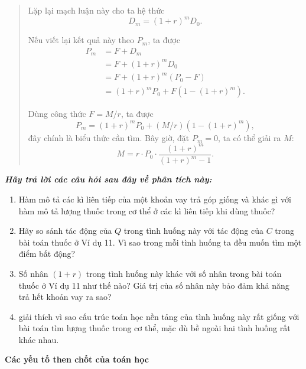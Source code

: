 {\begin{quote}
      Lặp lại mạch luận này cho ta hệ thức
      $$
        D_m = (1 + r)^m D_0.
      $$

      Nếu viết lại kết quả này theo $P_m$, ta được
      \begin{align*}
      P_m
        &=F+D_m \\
        &=F+(1+r)^mD_0 \\
        &=F+(1+r)^m(P_0-F) \\
        &=(1+r)^mP_0+F\left(1-(1+r)^m\right).
      \end{align*}

      Dùng công thức $F=M/r$, ta được\vspace{\baselineskip}
      $$
        P_m=(1+r)^mP_0+(M/r)\left(1-(1+r)^m\right),
      $$
      đây chính là biểu thức cần tìm. Bây giờ, đặt $P_m=0$, ta có thể giải ra $M$:
      $$
        M=r\cdot P_0\cdot \frac{(1+r)^m}{(1+r)^m-1}.
      $$
    \end{quote}

    \textbf{\emph{Hãy trả lời các câu hỏi sau đây về phân tích này:}}

    \begin{enumerate}
      \item Hàm mô tả các kì liên tiếp của một khoản vay trả góp giống và khác gì với hàm mô tả lượng thuốc trong cơ thể ở các kì liên tiếp khi dùng thuốc?\vspace{\baselineskip}
      
      \item Hãy so sánh tác động của $Q$ trong tình huống này với tác động của $C$ trong bài toán thuốc ở Ví dụ 11. Vì sao trong mỗi tình huống ta đều muốn tìm một điểm bất động?
      
      \item Số nhân $(1+r)$ trong tình huống này khác với số nhân trong bài toán thuốc ở Ví dụ 11 như thế nào? Giá trị của số nhân này bảo đảm khả năng trả hết khoản vay ra sao?\vspace{\baselineskip}
      
      \item giải thích vì sao cấu trúc toán học nền tảng của tình huống này rất giống với bài toán tìm lượng thuốc trong cơ thể, mặc dù bề ngoài hai tình huống rất khác nhau.
    \end{enumerate}\vspace{\baselineskip}

    \textbf{Các yếu tố then chốt của toán học}

    \begin{hanglist}


\end{hanglist}}
